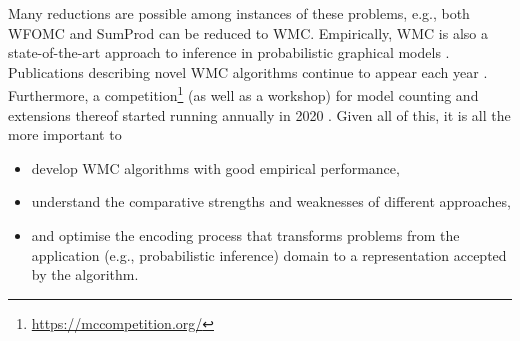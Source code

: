 Many reductions are possible among instances of these problems, e.g., both WFOMC and SumProd can be reduced to WMC. Empirically, WMC is also a state-of-the-art approach to inference in probabilistic graphical models \citep{DBLP:conf/ijcai/AgrawalPM21}. Publications describing novel WMC algorithms continue to appear each year \citep{DBLP:conf/cp/DudekPV20,DBLP:conf/cp/KorhonenJ21}. Furthermore, a competition\footnote{\url{https://mccompetition.org/}} (as well as a workshop) for model counting and extensions thereof started running annually in 2020 \citep{DBLP:journals/corr/abs-2012-01323}. Given all of this, it is all the more important to
\begin{itemize}
\item develop WMC algorithms with good empirical performance,
\item understand the comparative strengths and weaknesses of different approaches,
\item and optimise the encoding process that transforms problems from the application (e.g., probabilistic inference) domain to a representation accepted by the algorithm.
\end{itemize}



